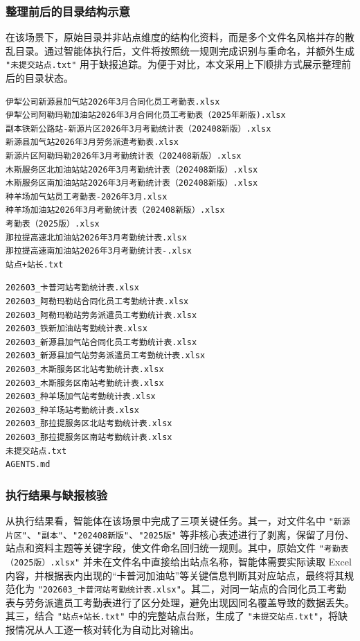 \subsubsection{整理前后的目录结构示意}

在该场景下，原始目录并非站点维度的结构化资料，而是多个文件名风格并存的散乱目录。通过智能体执行后，文件将按照统一规则完成识别与重命名，并额外生成 \lstinline|"未提交站点.txt"| 用于缺报追踪。为便于对比，本文采用上下顺排方式展示整理前后的目录状态。

\begin{lstlisting}[style=treeview,caption={整理前的示意性目录结构}]
伊犁公司新源县加气站2026年3月合同化员工考勤表.xlsx
伊犁公司阿勒玛勒加油站2026年3月合同化员工考勤表（2025年新版).xlsx
副本铁新公路站-新源片区2026年3月考勤统计表（202408新版）.xlsx
新源县加气站2026年3月劳务派遣考勤表.xlsx
新源片区阿勒玛勒2026年3月考勤统计表（202408新版）.xlsx
木斯服务区北加油站站2026年3月考勤统计表（202408新版）.xlsx
木斯服务区南加油站站2026年3月考勤统计表（202408新版）.xlsx
种羊场加气站员工考勤表-2026年3月.xlsx
种羊场加油站2026年3月考勤统计表（202408新版）.xlsx
考勤表（2025版）.xlsx
那拉提高速北加油站2026年3月考勤统计表.xlsx
那拉提高速南加油站2026年3月考勤统计表-.xlsx
站点+站长.txt
\end{lstlisting}

\newpage

\begin{lstlisting}[style=treeview,caption={整理后的示意性目录结构}]
202603_卡普河站考勤统计表.xlsx
202603_阿勒玛勒站合同化员工考勤统计表.xlsx
202603_阿勒玛勒站劳务派遣员工考勤统计表.xlsx
202603_铁新加油站考勤统计表.xlsx
202603_新源县加气站合同化员工考勤统计表.xlsx
202603_新源县加气站劳务派遣员工考勤统计表.xlsx
202603_木斯服务区北站考勤统计表.xlsx
202603_木斯服务区南站考勤统计表.xlsx
202603_种羊场加气站考勤统计表.xlsx
202603_种羊场站考勤统计表.xlsx
202603_那拉提服务区北站考勤统计表.xlsx
202603_那拉提服务区南站考勤统计表.xlsx
未提交站点.txt
AGENTS.md
\end{lstlisting}

\subsubsection{执行结果与缺报核验}

从执行结果看，智能体在该场景中完成了三项关键任务。其一，对文件名中 \lstinline|"新源片区"|、\lstinline|"副本"|、\lstinline|"202408新版"|、\lstinline|"2025版"| 等非核心表述进行了剥离，保留了月份、站点和资料主题等关键字段，使文件命名回归统一规则。其中，原始文件 \lstinline|"考勤表（2025版）.xlsx"| 并未在文件名中直接给出站点名称，智能体需要实际读取 Excel 内容，并根据表内出现的“卡普河加油站”等关键信息判断其对应站点，最终将其规范化为 \lstinline|"202603_卡普河站考勤统计表.xlsx"|。其二，对同一站点的合同化员工考勤表与劳务派遣员工考勤表进行了区分处理，避免出现因同名覆盖导致的数据丢失。其三，结合 \lstinline|"站点+站长.txt"| 中的完整站点台账，生成了 \lstinline|"未提交站点.txt"|，将缺报情况从人工逐一核对转化为自动比对输出。

